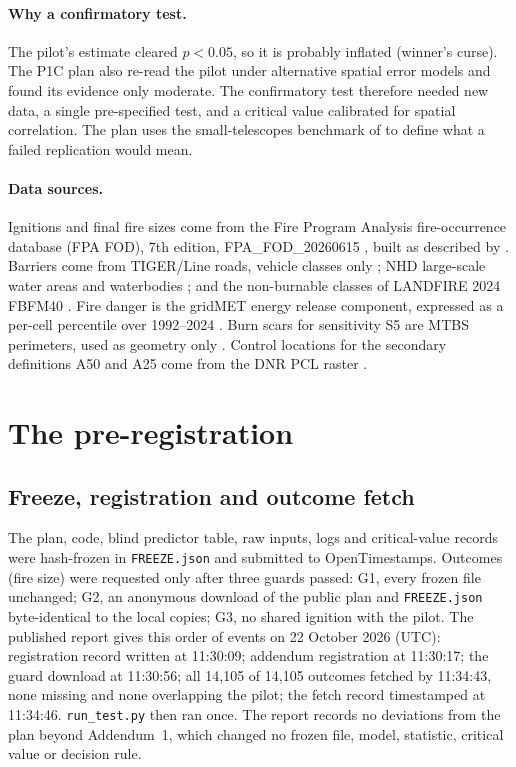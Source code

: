 \documentclass[11pt]{article}
\begin{document}
\paragraph{Why a confirmatory test.} The pilot's estimate cleared $p<0.05$, so it is probably inflated (winner's curse).
The P1C plan also re-read the pilot under alternative spatial error models and found its evidence only moderate. The
confirmatory test therefore needed new data, a single pre-specified test, and a critical value calibrated for spatial
correlation. The plan uses the small-telescopes benchmark of \citet{Simonsohn2015} to define what a failed replication
would mean.

\paragraph{Data sources.} Ignitions and final fire sizes come from the Fire Program Analysis fire-occurrence database
(FPA FOD), 7th edition, FPA\_FOD\_20260615 \citep{Short2026FPAFOD7}, built as described by \citet{Short2014ESSD}.
Barriers come from TIGER/Line roads, vehicle classes only \citep{CensusTIGER}; NHD large-scale water areas and waterbodies \citep{USGSNHD};
and the non-burnable classes of LANDFIRE 2024 FBFM40 \citep{LANDFIRE2024,Rollins2009LANDFIRE,ScottBurgan2005}.
Fire danger is the gridMET energy release component, expressed as a per-cell percentile over 1992--2024 \citep{Abatzoglou2013gridMET}.
Burn scars for sensitivity S5 are MTBS perimeters, used as geometry only \citep{Eidenshink2007MTBS}. Control locations for the
secondary definitions A50 and A25 come from the DNR PCL raster \citep{OConnor2017PCL}.

\section{The pre-registration}

\subsection{Freeze, registration and outcome fetch}
The plan, code, blind predictor table, raw inputs, logs and critical-value records were hash-frozen in
\texttt{FREEZE.json} and submitted to OpenTimestamps. Outcomes (fire size) were requested only after three guards passed:
G1, every frozen file unchanged; G2, an anonymous download of the public plan and \texttt{FREEZE.json} byte-identical to the local copies;
G3, no shared ignition with the pilot. The published report gives this order of events on 22 October 2026 (UTC):
registration record written at 11:30:09; addendum registration at 11:30:17; the guard download at 11:30:56; all
14{,}105 of 14{,}105 outcomes fetched by 11:34:43, none missing and none overlapping the pilot; the fetch record timestamped
at 11:34:46. \texttt{run\_test.py} then ran once. The report records no deviations from the plan beyond Addendum~1, which
changed no frozen file, model, statistic, critical value or decision rule.
\end{document}
